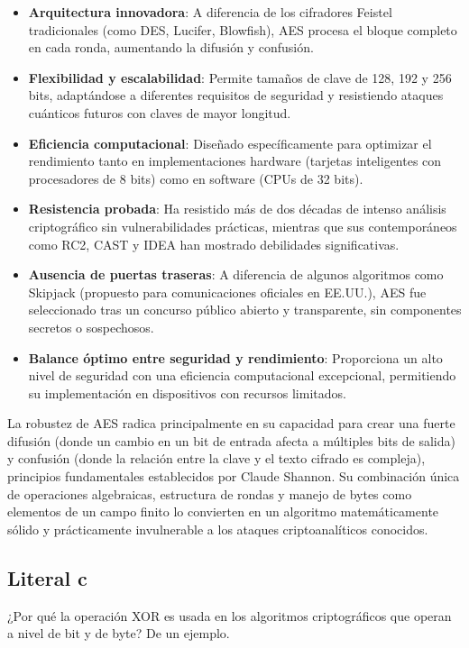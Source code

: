 {\begin{itemize}
    \item \textbf{Arquitectura innovadora}: A diferencia de los cifradores Feistel tradicionales (como DES, Lucifer, Blowfish), AES procesa el bloque completo en cada ronda, aumentando la difusión y confusión.
    
    \item \textbf{Flexibilidad y escalabilidad}: Permite tamaños de clave de 128, 192 y 256 bits, adaptándose a diferentes requisitos de seguridad y resistiendo ataques cuánticos futuros con claves de mayor longitud.
    
    \item \textbf{Eficiencia computacional}: Diseñado específicamente para optimizar el rendimiento tanto en implementaciones hardware (tarjetas inteligentes con procesadores de 8 bits) como en software (CPUs de 32 bits).
    
    \item \textbf{Resistencia probada}: Ha resistido más de dos décadas de intenso análisis criptográfico sin vulnerabilidades prácticas, mientras que sus contemporáneos como RC2, CAST y IDEA han mostrado debilidades significativas.
    
    \item \textbf{Ausencia de puertas traseras}: A diferencia de algunos algoritmos como Skipjack (propuesto para comunicaciones oficiales en EE.UU.), AES fue seleccionado tras un concurso público abierto y transparente, sin componentes secretos o sospechosos.
    
    \item \textbf{Balance óptimo entre seguridad y rendimiento}: Proporciona un alto nivel de seguridad con una eficiencia computacional excepcional, permitiendo su implementación en dispositivos con recursos limitados.
\end{itemize}

La robustez de AES radica principalmente en su capacidad para crear una fuerte difusión (donde un cambio en un bit de entrada afecta a múltiples bits de salida) y confusión (donde la relación entre la clave y el texto cifrado es compleja), principios fundamentales establecidos por Claude Shannon. Su combinación única de operaciones algebraicas, estructura de rondas y manejo de bytes como elementos de un campo finito lo convierten en un algoritmo matemáticamente sólido y prácticamente invulnerable a los ataques criptoanalíticos conocidos.




\subsection{Literal c}
¿Por qué la operación XOR es usada en los algoritmos criptográficos que operan a nivel de bit y de byte? De un ejemplo.

}

